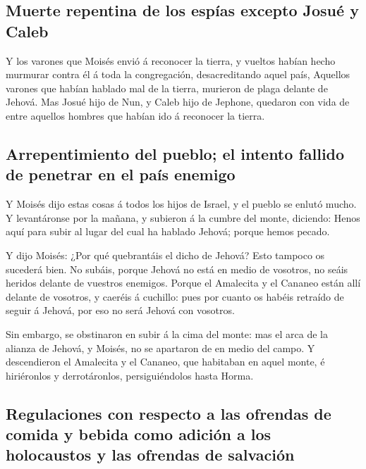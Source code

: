 \hypertarget{muerte-repentina-de-los-espuxedas-excepto-josuuxe9-y-caleb}{%
\subsection{Muerte repentina de los espías excepto Josué y
Caleb}\label{muerte-repentina-de-los-espuxedas-excepto-josuuxe9-y-caleb}}

 Y los varones que Moisés envió á reconocer la tierra, y
vueltos habían hecho murmurar contra él á toda la congregación,
desacreditando aquel país,  Aquellos varones que habían
hablado mal de la tierra, murieron de plaga delante de Jehová.
 Mas Josué hijo de Nun, y Caleb hijo de Jephone, quedaron
con vida de entre aquellos hombres que habían ido á reconocer la tierra.

\hypertarget{arrepentimiento-del-pueblo-el-intento-fallido-de-penetrar-en-el-pauxeds-enemigo}{%
\subsection{Arrepentimiento del pueblo; el intento fallido de penetrar
en el país
enemigo}\label{arrepentimiento-del-pueblo-el-intento-fallido-de-penetrar-en-el-pauxeds-enemigo}}

 Y Moisés dijo estas cosas á todos los hijos de Israel, y
el pueblo se enlutó mucho.  Y levantáronse por la mañana,
y subieron á la cumbre del monte, diciendo: Henos aquí para subir al
lugar del cual ha hablado Jehová; porque hemos pecado.

 Y dijo Moisés: ¿Por qué quebrantáis el dicho de Jehová?
Esto tampoco os sucederá bien.  No subáis, porque Jehová
no está en medio de vosotros, no seáis heridos delante de vuestros
enemigos.  Porque el Amalecita y el Cananeo están allí
delante de vosotros, y caeréis á cuchillo: pues por cuanto os habéis
retraído de seguir á Jehová, por eso no será Jehová con vosotros.

 Sin embargo, se obstinaron en subir á la cima del monte:
mas el arca de la alianza de Jehová, y Moisés, no se apartaron de en
medio del campo.  Y descendieron el Amalecita y el
Cananeo, que habitaban en aquel monte, é hiriéronlos y derrotáronlos,
persiguiéndolos hasta Horma.

\hypertarget{regulaciones-con-respecto-a-las-ofrendas-de-comida-y-bebida-como-adiciuxf3n-a-los-holocaustos-y-las-ofrendas-de-salvaciuxf3n}{%
\subsection{Regulaciones con respecto a las ofrendas de comida y bebida
como adición a los holocaustos y las ofrendas de
salvación}\label{regulaciones-con-respecto-a-las-ofrendas-de-comida-y-bebida-como-adiciuxf3n-a-los-holocaustos-y-las-ofrendas-de-salvaciuxf3n}}

